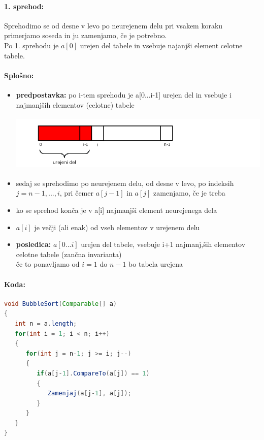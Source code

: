 \documentclass[a4paper,10pt]{article}
\begin{document}
\paragraph{1. sprehod:}
Sprehodimo se od desne v levo po neurejenem delu pri vsakem koraku primerjamo soseda in ju zamenjamo, \v ce je potrebno.\\
Po 1. sprehodu je $a[0]$ urejen del tabele in vsebuje najanj\v si element celotne tabele.

\paragraph{Splo\v sno:}
\begin{itemize}
\item \textbf{predpostavka:} po i-tem sprehodu je a[0...i-1] urejen del in vsebuje i najmanj\v sih elementov (celotne) tabele\\
	\begin{center}
	\includegraphics[width=13.75cm,height=2.7cm]{Slike/NavadneZamenjaveSplosno.png}
	\end{center}
\item sedaj se sprehodimo po neurejenem delu, od desne v levo, po indeksih $j=n-1,...,i$, pri \v cemer $a[j-1]$ in $a[j]$ zamenjamo, \v ce je treba
\item ko se sprehod kon\v ca je v a[i] najmanj\v si element neurejenega dela
\item $a[i]$ je ve\v cji (ali enak) od vseh elementov v urejenem delu
\item \textbf{posledica:} $a[0...i]$ urejen del tabele, vsebuje i+1 najmanj,\v sih elementov celotne tabele (zan\v cna invarianta)\\
\v ce to ponavljamo od $i=1$ do $n-1$ bo tabela urejena
\end{itemize}

\paragraph{Koda:}
\begin{flushleft}
\begin{lstlisting}[caption={BubbleSort}, language={Java}]
void BubbleSort(Comparable[] a)
{
   int n = a.length;
   for(int i = 1; i < n; i++)
   {
      for(int j = n-1; j >= i; j--)
      {
         if(a[j-1].CompareTo(a[j]) == 1)
         {
            Zamenjaj(a[j-1], a[j]);
         }
      }
   }
}
\end{lstlisting}
\end{flushleft}
\end{document}
